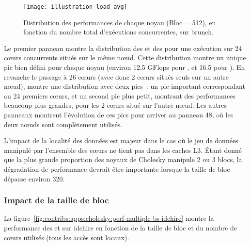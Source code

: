 \begin{figure}[ht]
  \centering
  \texttt{[image: illustration\_load\_avg]}
  \caption{Distribution des performances de chaque noyau (Bloc = 512), en fonction du nombre total d'exécutions concurrentes, sur brunch.}\label{fig:contribs:apps:cholesky:distrib-load-512}
\end{figure}

Le premier panneau montre la distribution des \gemm et des \potrf pour une exécution sur 24 cœurs concurrents situés sur le même nœud.
Cette distribution montre un unique pic bien défini pour chaque noyau (environ 12.5 GFlops pour \potrf, et 16.5 pour \gemm).
En revanche le passage à 26 cœurs (avec donc 2 cœurs situés seuls sur un autre nœud), montre une distribution avec deux pics~: un pic important correspondant au 24 premiers cœurs, et un second pic plus petit, montrant des performances beaucoup plus grandes, pour les 2 cœurs situé sur l'autre nœud.
Les autres panneaux montrent l'évolution de ces pics pour arriver au panneau 48, où les deux nœuds sont complètement utilisés.



L'impact de la localité des données est majeur dans le cas où le jeu de données manipulé par l'ensemble des cœurs ne tient pas dans les caches L3.
Étant donné que la plus grande proportion des noyaux de Cholesky manipule 2 ou 3 blocs, la dégradation de performance devrait être importante lorsque la taille de bloc dépasse environ 320.




\subsubsection{Impact de la taille de bloc}

La figure~\ref{fig:contribs:apps:cholesky:perf-multiple-bs-idchire} montre la performance des \gemm et \potrf sur idchire en fonction de la taille de bloc et du nombre de cœurs utilisés (tous les accès sont locaux).

